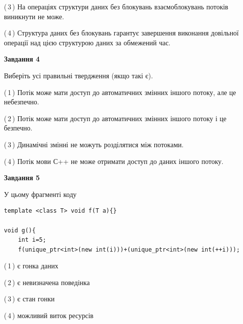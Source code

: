 \documentclass[12pt, ukrainian]{article}
\begin{document}
\begin {large}
{(\,3\,) На операціях структури даних без блокувань взаємоблокувань потоків виникнути не може.%

(\,4\,) Структура даних без блокувань гарантує завершення виконання довільної операції над цією структурою даних за обмежений час.%



\begin{center}
\textbf{Завдання 4}
\end{center}
Виберіть усі правильні твердження (якщо такі є).\par
\vspace{2mm}

(\,1\,) Потік може мати доступ до автоматичних змінних іншого потоку, але це небезпечно.%

(\,2\,) Потік може мати доступ до автоматичних змінних іншого потоку і це безпечно.%

(\,3\,) Динамічні змінні не можуть розділятися між потоками.%

(\,4\,) Потік мови С++ не може отримати доступ до даних іншого потоку.%



\begin{center}
\textbf{Завдання 5}
\end{center}
У цьому фрагменті коду
\begin{verbatim}
template <class T> void f(T a){}

void g(){
    int i=5;
    f(unique_ptr<int>(new int(i)))+(unique_ptr<int>(new int(++i)));
\end{verbatim}
(\,1\,) є гонка даних%

(\,2\,) є невизначена поведінка%

(\,3\,) є стан гонки%

(\,4\,) можливий виток ресурсів%


}
\end {large}
\end{document}
